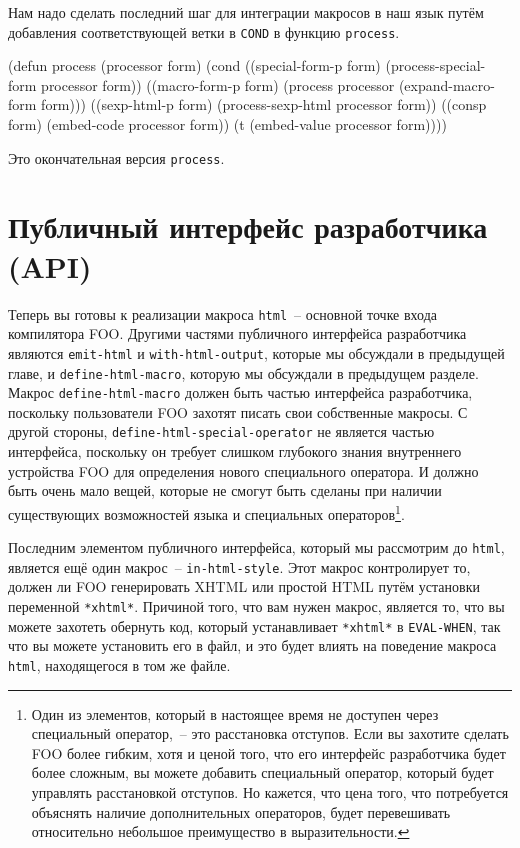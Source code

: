 Нам надо сделать последний шаг для интеграции макросов в наш язык путём добавления
соответствующей ветки в \lstinline{COND} в функцию \lstinline{process}.

\begin{myverb}
(defun process (processor form)
  (cond
    ((special-form-p form) (process-special-form processor form))
    ((macro-form-p form)   (process processor (expand-macro-form form)))
    ((sexp-html-p form)    (process-sexp-html processor form))
    ((consp form)          (embed-code processor form))
    (t                     (embed-value processor form))))
\end{myverb}

Это окончательная версия \lstinline{process}.

\section{Публичный интерфейс разработчика (API)}

Теперь вы готовы к реализации макроса \lstinline{html}~-- основной точке входа компилятора
FOO. Другими частями публичного интерфейса разработчика являются \lstinline{emit-html} и
\lstinline{with-html-output}, которые мы обсуждали в предыдущей главе, и
\lstinline{define-html-macro}, которую мы обсуждали в предыдущем разделе. Макрос
\lstinline{define-html-macro} должен быть частью интерфейса разработчика, поскольку
пользователи FOO захотят писать свои собственные макросы. С другой стороны,
\lstinline{define-html-special-operator} не является частью интерфейса, поскольку он требует
слишком глубокого знания внутреннего устройства FOO для определения нового специального
оператора. И должно быть очень мало вещей, которые не смогут быть сделаны при наличии
существующих возможностей языка и специальных операторов\footnote{Один из элементов,
  который в настоящее время не доступен через специальный оператор,~-- это расстановка
  отступов.  Если вы захотите сделать FOO более гибким, хотя и ценой того, что его
  интерфейс разработчика будет более сложным, вы можете добавить специальный оператор,
  который будет управлять расстановкой отступов.  Но кажется, что цена того, что
  потребуется объяснять наличие дополнительных операторов, будет перевешивать относительно
  небольшое преимущество в выразительности.}.

Последним элементом публичного интерфейса, который мы рассмотрим до \lstinline{html}, является
ещё один макрос~-- \lstinline{in-html-style}.  Этот макрос контролирует то, должен ли FOO
генерировать XHTML или простой HTML путём установки переменной \lstinline{*xhtml*}.  Причиной
того, что вам нужен макрос, является то, что вы можете захотеть обернуть код, который
устанавливает \lstinline{*xhtml*} в \lstinline{EVAL-WHEN}, так что вы можете установить его в файл,
и это будет влиять на поведение макроса \lstinline{html}, находящегося в том же файле.

